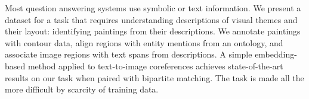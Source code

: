 Most question answering systems use symbolic or text information. We present a dataset for a task that requires understanding descriptions of visual themes and their layout: identifying paintings from their descriptions. We annotate paintings with contour data, align regions with entity mentions from an ontology, and associate image regions with text spans from descriptions. A simple embedding-based method applied to text-to-image coreferences achieves state-of-the-art results on our task when paired with bipartite matching. The task is made all the more difficult by scarcity of training data.
